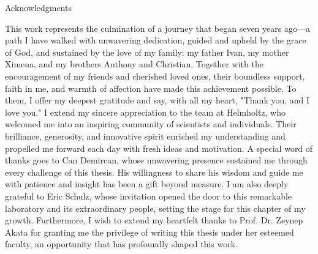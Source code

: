 \thispagestyle{empty}

\vspace*{20mm}

\begin{center}
    { Acknowledgments}
\end{center}

\vspace{10mm}

This work represents the culmination of a journey that began seven years ago—a path I have walked
with unwavering dedication, guided and upheld by the grace of God, and sustained by the
love of my family: my father Ivan, my mother Ximena, and my brothers Anthony and Christian. 
Together with the encouragement of my friends and cherished loved ones, their boundless support, 
faith in me, and warmth of affection have made this achievement possible. To them, I offer my 
deepest gratitude and say, with all my heart, "Thank you, and I love you."
\newline
\newline
I extend my sincere appreciation to the team at Helmholtz, who welcomed me into an inspiring 
community of scientists and individuals. Their brilliance, generosity, and innovative spirit 
enriched my understanding and propelled me forward each day with fresh ideas and motivation. 
A special word of thanks goes to Can Demircan, whose unwavering presence sustained me through every 
challenge of this thesis. His willingness to share his wisdom and guide me with patience and 
insight has been a gift beyond measure. I am also deeply grateful to Eric Schulz, whose 
invitation opened the door to this remarkable laboratory and its extraordinary people, setting 
the stage for this chapter of my growth. Furthermore, I wish to extend my heartfelt thanks 
to Prof. Dr. Zeynep Akata for granting me the privilege of writing this thesis under her 
esteemed faculty, an opportunity that has profoundly shaped this work.
\cleardoublepage{}
